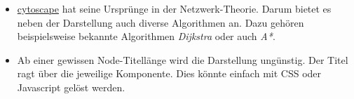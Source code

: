 \begin{itemize}
    \item \hyperref[cytoscape]{cytoscape} hat seine Ursprünge in der \gls{Netzwerk}-Theorie. Darum bietet es neben der Darstellung auch diverse Algorithmen an. Dazu gehören beispielsweise bekannte Algorithmen \textit{Dijkstra} oder auch \textit{A*}. \citep{cytoscape-js}
    \item Ab einer gewissen \gls{Node}-Titellänge wird die Darstellung un\-gün\-stig. Der Titel ragt über die jeweilige Komponente. Dies könnte einfach mit \gls{CSS} oder \gls{Javascript} gelöst werden.
\end{itemize}